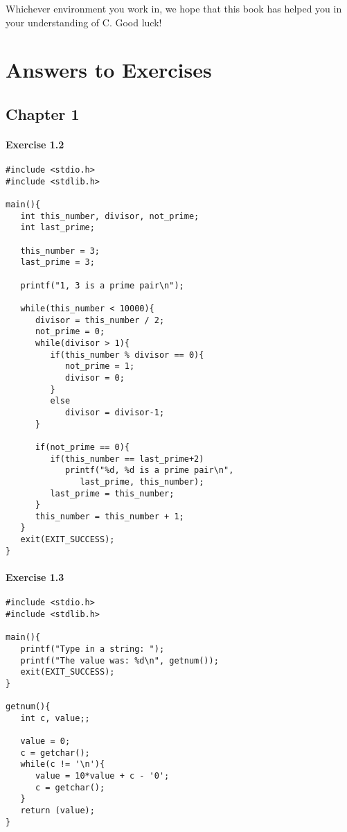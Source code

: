   Whichever environment you work in, we hope that this book has helped
   you in your understanding of C. Good luck!


 \chapter*{Answers to Exercises}


        \section*{Chapter 1}
        

  

  \subsubsection*{Exercise 1.2}

   \begin{Verbatim}
#include <stdio.h>
#include <stdlib.h>

main(){
   int this_number, divisor, not_prime;
   int last_prime;

   this_number = 3;
   last_prime = 3;

   printf("1, 3 is a prime pair\n");

   while(this_number < 10000){
      divisor = this_number / 2;
      not_prime = 0;
      while(divisor > 1){
         if(this_number % divisor == 0){
            not_prime = 1;
            divisor = 0;
         }
         else
            divisor = divisor-1;
      }

      if(not_prime == 0){
         if(this_number == last_prime+2)
            printf("%d, %d is a prime pair\n",
               last_prime, this_number);
         last_prime = this_number;
      }
      this_number = this_number + 1;
   }
   exit(EXIT_SUCCESS);
}
\end{Verbatim}

  

  \subsubsection*{Exercise 1.3}

   \begin{Verbatim}
#include <stdio.h>
#include <stdlib.h>

main(){
   printf("Type in a string: ");
   printf("The value was: %d\n", getnum());
   exit(EXIT_SUCCESS);
}

getnum(){
   int c, value;;

   value = 0;
   c = getchar();
   while(c != '\n'){
      value = 10*value + c - '0';
      c = getchar();
   }
   return (value);
}
\end{Verbatim}

